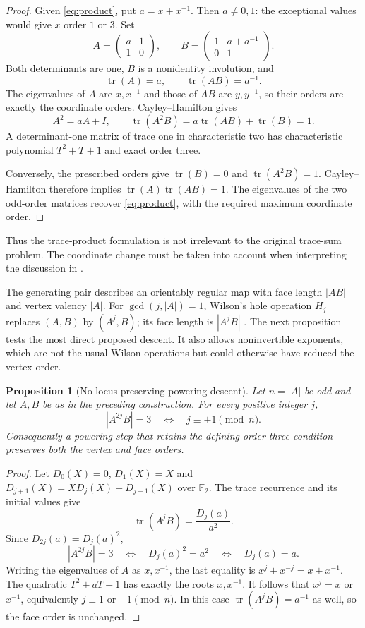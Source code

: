 \documentclass[a4paper]{article}
\newtheorem{proposition}[theorem]{Proposition}
\DeclareMathOperator{\tr}{tr}
\newcommand{\F}{\mathbb F}
\begin{document}
\begin{proof}
Given \eqref{eq:product}, put $a=x+x^{-1}$.  Then
$a\ne0,1$: the exceptional values would give $x$ order $1$ or $3$.
Set
\[
 A=\begin{pmatrix}a&1\\1&0\end{pmatrix},
 \qquad B=\begin{pmatrix}1&a+a^{-1}\\0&1\end{pmatrix}.
\]
Both determinants are one, $B$ is a nonidentity involution, and
\[
 \tr(A)=a,\qquad \tr(AB)=a^{-1}.
\]
The eigenvalues of $A$ are $x,x^{-1}$ and those of $AB$ are
$y,y^{-1}$, so their orders are exactly the coordinate orders.
Cayley--Hamilton gives
\[
 A^2=aA+I,\qquad
 \tr(A^2B)=a\tr(AB)+\tr(B)=1.
\]
A determinant-one matrix of trace one in characteristic two has
characteristic polynomial $T^2+T+1$ and exact order three.

Conversely, the prescribed orders give $\tr(B)=0$ and
$\tr(A^2B)=1$.  Cayley--Hamilton therefore implies
$\tr(A)\tr(AB)=1$.
The eigenvalues of the two odd-order matrices recover
\eqref{eq:product}, with the required maximum coordinate order.
\end{proof}

Thus the trace-product formulation is not irrelevant to the original
trace-sum problem.  The coordinate change must be taken into account
when interpreting the discussion in \cite{plateau}.

The generating pair describes an orientably regular map with face
length $|AB|$ and vertex valency $|A|$.
For $\gcd(j,|A|)=1$, Wilson's hole operation $H_j$ replaces
$(A,B)$ by $(A^j,B)$; its face length is $|A^jB|$ \cite{holes}.
The next proposition tests the most direct proposed descent.
It also allows noninvertible exponents, which are not the usual
Wilson operations but could otherwise have reduced the vertex order.

\begin{proposition}[No locus-preserving powering descent]\label{prop:holing}
Let $n=|A|$ be odd and let $A,B$ be as in the preceding construction.
For every positive integer $j$,
\[
 |A^{2j}B|=3\quad\Longleftrightarrow\quad j\equiv\pm1\pmod n.
\]
Consequently a powering step that retains the defining order-three
condition preserves both the vertex and face orders.
\end{proposition}

\begin{proof}
Let $D_0(X)=0$, $D_1(X)=X$ and
$D_{j+1}(X)=XD_j(X)+D_{j-1}(X)$ over $\F_2$.
The trace recurrence and its initial values give
\[
 \tr(A^jB)=\frac{D_j(a)}{a^2}.
\]
Since $D_{2j}(a)=D_j(a)^2$,
\[
 |A^{2j}B|=3
 \quad\Longleftrightarrow\quad D_j(a)^2=a^2
 \quad\Longleftrightarrow\quad D_j(a)=a.
\]
Writing the eigenvalues of $A$ as $x,x^{-1}$, the last equality is
$x^j+x^{-j}=x+x^{-1}$.
The quadratic $T^2+aT+1$ has exactly the roots $x,x^{-1}$.
It follows that $x^j=x$ or $x^{-1}$, equivalently
$j\equiv1$ or $-1\pmod n$.
In this case $\tr(A^jB)=a^{-1}$ as well, so the face order is unchanged.
\end{proof}
\end{document}
